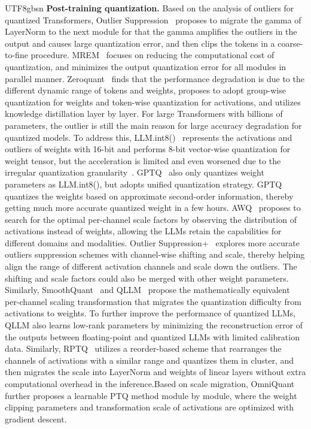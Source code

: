 \documentclass[10pt,journal,compsoc]{IEEEtran}
\newcommand{\<}{\left\langle}
\renewcommand{\>}{\right\rangle}
\newcommand{\1}{\mathbbm{1}}
\begin{document}
\begin{CJK}{UTF8}{gbsn}
\noindent \textbf{Post-training quantization. }
Based on the analysis of outliers for quantized Transformers,  Outlier Suppression~\cite{wei2022outlier} proposes to migrate the gamma of LayerNorm to the next module for that the gamma amplifies the outliers in the output and causes large quantization error, and then clips the tokens in a coarse-to-fine procedure. MREM~\cite{bai2022towards} focuses on reducing the computational cost of quantization, and minimizes the output quantization error for all modules in parallel manner. Zeroquant~\cite{yao2022zeroquant} finds that the performance degradation is due to the different dynamic range of tokens and weights, proposes to adopt group-wise quantization for weights and token-wise quantization for activations, and utilizes knowledge distillation layer by layer. For large Transformers with billions of parameters, the outlier is still the main reason for large accuracy degradation for quantized models.
To address this, LLM.int8()~\cite{dettmers2022llm} represents the activations and outliers of weights with 16-bit and performs 8-bit vector-wise quantization for weight tensor, but the acceleration is limited and even worsened due to the irregular quantization granularity~\cite{xiao2023smoothquant}. GPTQ~\cite{frantar2022gptq} also only quantizes weight parameters as LLM.int8(), but adopts unified quantization strategy. GPTQ quantizes the weights based on approximate second-order information, thereby getting much more accurate quantized weight in a few hours. AWQ~\cite{lin2023awq} proposes to search for the optimal per-channel scale factors by observing the distribution of activations instead of weights, allowing the LLMs retain the capabilities for different domains and modalities. Outlier Suppression+~\cite{wei2023outlier} explores more accurate outliers suppression schemes with channel-wise shifting and scale, thereby helping align the range of different activation channels and scale down the outliers. The shifting and scale factors could also be merged with other weight parameters. Similarly, SmoothQuant~\cite{xiao2023smoothquant} and QLLM~\cite{liu2023qllm} propose the mathematically equivalent per-channel scaling transformation that migrates the quantization difficulty from activations to weights. To further improve the performance of quantized LLMs, QLLM also learns low-rank parameters by minimizing the reconstruction error of the outputs between floating-point and quantized LLMs with limited calibration data. Similarly, RPTQ~\cite{yuan2023rptq} utilizes a reorder-based scheme that rearranges the channels of activations with a similar range and quantizes them in cluster, and then migrates the scale into LayerNorm and weights of linear layers without extra computational overhead in the inference.Based on scale migration, OmniQuant~\cite{shao2023omniquant} further proposes a learnable PTQ method module by module, where the weight clipping parameters and transformation scale of activations are optimized with gradient descent. 

\end{CJK}
\end{document}

